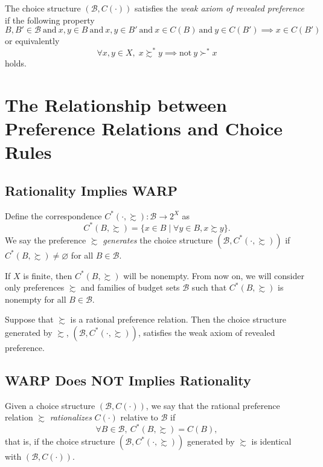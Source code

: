 \documentclass[11pt,fleqn]{book} %
\begin{document}
\begin{definition}
	The choice structure $(\mathcal{B},C(\cdot))$ satisfies the \emph{weak axiom of revealed preference} if the following property
	\[
	B,B'\in \mathcal{B}\ \text{and}\ x,y\in B\ \text{and}\ x,y\in B'\ \text{and}\ x\in C(B)\ \text{and}\ y\in C(B')\implies x\in C(B')
	\]
	or equivalently
	\[
	\forall x,y\in X,\;x\succsim^*y\implies\text{not}\ y\succ^*x
	\]
	holds.
\end{definition}

\section{The Relationship between Preference Relations and Choice Rules }

\subsection{Rationality Implies WARP}
\vspace{4pt}
\begin{definition}
	Define the correspondence $C^*(\cdot,\succsim):\mathcal{B}\rightarrow 2^X$ as 
	\[
	C^*(B,\succsim)=\{x\in B\;|\;\forall y\in B, x\succsim y\}.
	\]
	We say the preference $\succsim$ \emph{generates} the choice structure $(\mathcal{B},C^*(\cdot,\succsim))$ if $C^*(B,\succsim)\ne\varnothing$ for all $B\in\mathcal{B}$.
	
\end{definition}

\begin{remark}
    If $X$ is finite, then $C^*(B,\succsim)$ will be nonempty. From now on, we will consider only preferences $\succsim$ and families of budget sets $\mathcal{B}$ such that $C^*(B,\succsim)$ is nonempty for all $B\in\mathcal{B}$.
\end{remark}

\begin{proposition}
	Suppose that $\succsim$ is a rational preference relation. Then the choice structure generated by $\succsim$, $(\mathcal{B},C^*(\cdot,\succsim))$, satisfies the weak axiom of revealed preference. 
\end{proposition}

\subsection{WARP Does NOT Implies Rationality}
\vspace{4pt}
\begin{definition}[Rationalization]
	Given a choice structure $(\mathcal{B},C(\cdot))$, we say that the rational preference	relation $\succsim$ \emph{rationalizes} $C(\cdot)$ relative to $\mathcal{B}$ if
	\[
	\forall B\in\mathcal{B},\ C^*(B,\succsim)=C(B),
	\]
	that is, if the choice structure $(\mathcal{B},C^*(\cdot,\succsim))$  generated by $\succsim$ is identical with $(\mathcal{B},C(\cdot))$.
\end{definition}
\end{document}
